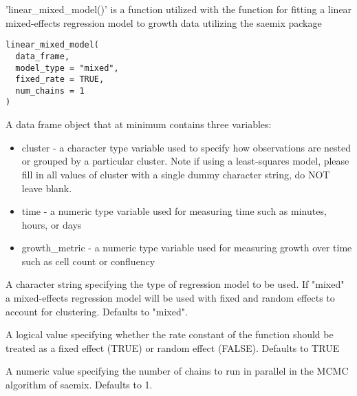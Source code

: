 \documentclass[a4paper]{book}
\begin{document}
%
\begin{Description}
'linear\_mixed\_model()' is a function utilized with the
 function for fitting a linear
mixed-effects regression model to growth data utilizing the saemix
package
\end{Description}
%
\begin{Usage}
\begin{verbatim}
linear_mixed_model(
  data_frame,
  model_type = "mixed",
  fixed_rate = TRUE,
  num_chains = 1
)
\end{verbatim}
\end{Usage}
%
\begin{Arguments}
\begin{ldescription}
\item[\code{data\_frame}] A data frame object that at minimum contains three
variables:
\begin{itemize}

\item{} cluster - a character type variable used to specify how observations
are nested or grouped by a particular cluster. Note if using a
least-squares model, please fill in all values of cluster with a single
dummy character string, do NOT leave blank.
\item{} time - a numeric type variable used for measuring time such as
minutes, hours, or days
\item{} growth\_metric - a numeric type variable used for measuring growth
over time such as cell count or confluency

\end{itemize}


\item[\code{model\_type}] A character string specifying the type of regression
model to be used. If "mixed" a mixed-effects regression model will be used
with fixed and random effects to account for clustering. Defaults to "mixed".

\item[\code{fixed\_rate}] A logical value specifying whether the rate constant
of the function should be treated as a fixed effect (TRUE) or random
effect (FALSE). Defaults to TRUE

\item[\code{num\_chains}] A numeric value specifying the number of chains to run
in parallel in the MCMC algorithm of saemix. Defaults to 1.
\end{ldescription}
\end{Arguments}
\end{document}
